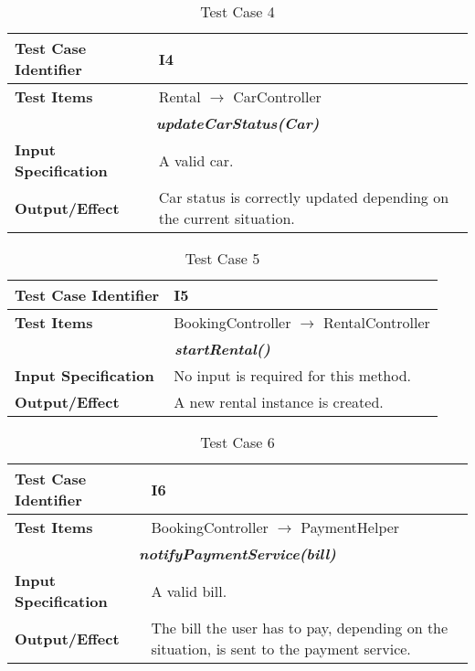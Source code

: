 \begin{table}[h]
	\begin{tabularx}{\textwidth}{l X}
		\hline
		\textbf{Test Case Identifier}	&	I4\\	\hline
		\textbf{Test Items}			&	Rental $\rightarrow$ CarController \\	\hline\hline
		\multicolumn{2}{c}{\textbf{\textit{updateCarStatus(Car)}}}	\\	\hline
			\textbf{Input Specification}	&	A valid car.\\	\hline
			\textbf{Output/Effect}	&	Car status is correctly updated depending on the current situation.\\	\hline\hline
	\end{tabularx}
	\captionsetup{textformat=empty,labelformat=blank}
	\caption{Test Case 4}
	\label{table:template-table-4}
\end{table}

\begin{table}[h]
	\begin{tabularx}{\textwidth}{l X}
		\hline
		\textbf{Test Case Identifier}	&	I5\\	\hline
		\textbf{Test Items}			&	BookingController $\rightarrow$ RentalController \\	\hline\hline
		\multicolumn{2}{c}{\textbf{\textit{startRental()}}}	\\	\hline
			\textbf{Input Specification}	&	No input is required for this method.\\	\hline
			\textbf{Output/Effect}	&	A new rental instance is created.\\	\hline\hline
	\end{tabularx}
	\captionsetup{textformat=empty,labelformat=blank}
	\caption{Test Case 5}
	\label{table:template-table-5}
\end{table}

\begin{table}[h]
	\begin{tabularx}{\textwidth}{l X}
		\hline
		\textbf{Test Case Identifier}	&	I6\\	\hline
		\textbf{Test Items}			&	BookingController $\rightarrow$ PaymentHelper \\	\hline\hline
		\multicolumn{2}{c}{\textbf{\textit{notifyPaymentService(bill)}}}	\\	\hline
			\textbf{Input Specification}	&	A valid bill.\\	\hline
			\textbf{Output/Effect}	&	The bill the user has to pay, depending on the situation, is sent to the payment service.\\	\hline\hline
	\end{tabularx}
	\captionsetup{textformat=empty,labelformat=blank}
	\caption{Test Case 6}
	\label{table:template-table-6}
\end{table}

